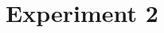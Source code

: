 \documentclass[authoryear, 12pt]{elsarticle}
\begin{document}


\section{Experiment 2}
\label{sec:exp2}
\end{document}
